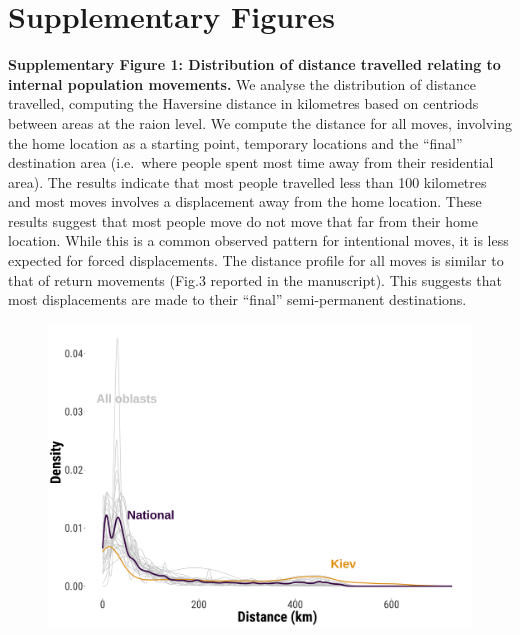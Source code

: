 \documentclass[
  11pt,
]{article}
\begin{document}
\newpage

\section{Supplementary Figures}\label{supplementary-figures}

\textbf{Supplementary Figure 1: Distribution of distance travelled
relating to internal population movements.} We analyse the distribution
of distance travelled, computing the Haversine distance in kilometres
based on centriods between areas at the raion level. We compute the
distance for all moves, involving the home location as a starting point,
temporary locations and the ``final'' destination area (i.e.~where
people spent most time away from their residential area). The results
indicate that most people travelled less than 100 kilometres and most
moves involves a displacement away from the home location. These results
suggest that most people move do not move that far from their home
location. While this is a common observed pattern for intentional moves,
it is less expected for forced displacements. The distance profile for
all moves is similar to that of return movements (Fig.3 reported in the
manuscript). This suggests that most displacements are made to their
``final'' semi-permanent destinations.

\begin{figure}[h]

\begin{minipage}{\linewidth}

\begin{center}
\includegraphics[width=5.20833in,height=\textheight,keepaspectratio]{../outputs/sm/distance_all-moves.png}
\end{center}

\end{minipage}%

\end{figure}%
\end{document}
